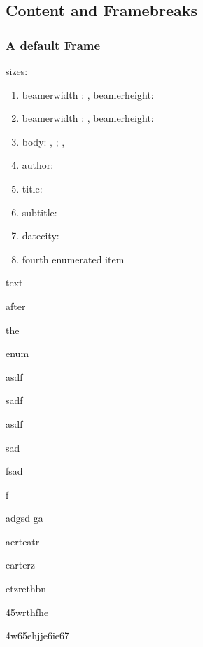 \documentclass[german,aspectratio=169,notoc,titlestyle=tud,draft]{tudbeamer}%
\begin{document}
\subsection*{Content and Framebreaks}
\begin{frame}[allowframebreaks]
	\frametitle{A default Frame}
	sizes:
	\begin{enumerate}
		\item beamerwidth : \the\paperwidth, beamerheight: \the\paperheight
		\item beamerwidth : \number\paperwidth, beamerheight:\number\paperheight
		\item body: \the\bodyx, \the\bodyy; \the\bodywidth, \the\bodywidth
		\item author: \insertauthor
		\item title: \inserttitle
		\item subtitle: \insertsubtitle
		\item datecity: \insertdatecity
		\item fourth enumerated item
	\end{enumerate}
	text 

	after 

	the 

	enum

	asdf

	sadf
	
	asdf
	
	sad
	
	fsad
	
	f

	adgsd
	ga

	aerteatr

	earterz

	etzrethbn

	45wrthfhe

	4w65ehjje6ie67
\end{frame}
\end{document}
